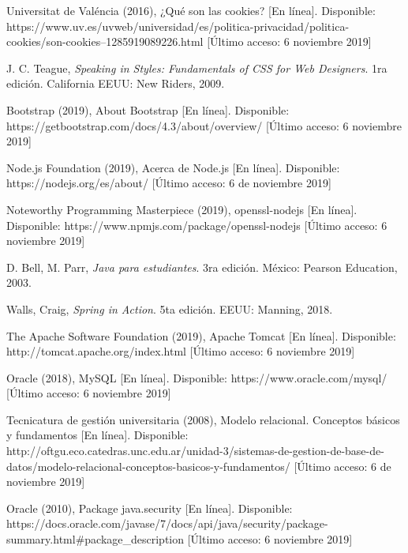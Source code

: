 \documentclass[12pt, a4paper, titlepage]{report}
\begin{document}
\begin{thebibliography}{20}
        Universitat de Valéncia (2016), ¿Qué son las cookies? [En línea]. Disponible:           https://www.uv.es/uvweb/universidad/es/politica-privacidad/politica-cookies/son-cookies--1285919089226.html [Último acceso: 6 noviembre 2019]
        
        J. C. Teague, \textit{Speaking in Styles: Fundamentals of CSS for Web Designers}. 1ra edición. California EEUU: New Riders, 2009.
        
        Bootstrap (2019), About Bootstrap [En línea]. Disponible: https://getbootstrap.com/docs/4.3/about/overview/ [Último acceso: 6 noviembre 2019]
        
        Node.js Foundation (2019), Acerca de Node.js [En línea]. Disponible: https://nodejs.org/es/about/ [Último acceso: 6 de noviembre 2019]
        
        Noteworthy Programming Masterpiece (2019), openssl-nodejs [En línea]. Disponible: https://www.npmjs.com/package/openssl-nodejs [Último acceso: 6 noviembre 2019]
        
        D. Bell, M. Parr, \textit{Java para estudiantes}. 3ra edición. México: Pearson Education, 2003.
        
        Walls, Craig, \textit{Spring in Action}. 5ta edición. EEUU: Manning, 2018.
        
        The Apache Software Foundation (2019), Apache Tomcat [En línea]. Disponible: http://tomcat.apache.org/index.html [Último acceso: 6 noviembre 2019]
        
        Oracle (2018), MySQL [En línea]. Disponible: https://www.oracle.com/mysql/ [Último acceso: 6 noviembre 2019]
        
        Tecnicatura de gestión universitaria (2008), Modelo relacional. Conceptos básicos y fundamentos [En línea]. Disponible:     http://oftgu.eco.catedras.unc.edu.ar/unidad-3/sistemas-de-gestion-de-base-de-datos/modelo-relacional-conceptos-basicos-y-fundamentos/ [Último acceso: 6 de noviembre 2019]
        
        Oracle (2010), Package java.security [En línea]. Disponible:        https://docs.oracle.com/javase/7/docs/api/java/security/package-summary.html\#package\_description [Último acceso: 6 noviembre 2019]
        

\end{thebibliography}
\end{document}
